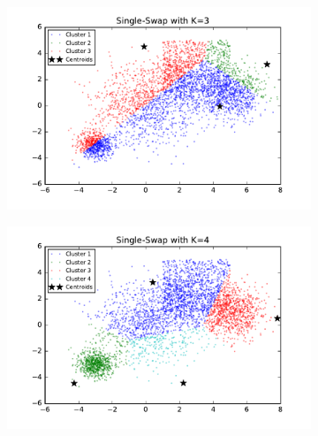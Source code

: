 \begin{figure}[htb]
        \centering
        \begin{subfigure}[b]{0.475\textwidth}
            \centering
            \includegraphics[width=\textwidth]{./figures/bigClustering_singleSwap_3.pdf}
        \end{subfigure}
        \hfill
        \begin{subfigure}[b]{0.475\textwidth}  
            \centering 
            \includegraphics[width=\textwidth]{./figures/bigClustering_singleSwap_4.pdf}
        \end{subfigure}
        \begin{subfigure}[b]{0.475\textwidth}  
            \centering 

\end{subfigure}
\end{figure}
